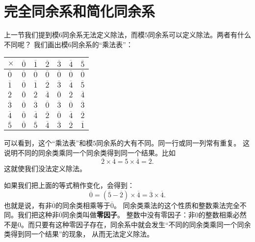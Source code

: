 \documentclass[12pt,UTF8]{ctexbook}
\theoremstyle{definition}
\theoremstyle{plain}
\begin{document}
\section{完全同余系和简化同余系}
上一节我们提到模$6$同余系无法定义除法，而模$5$同余系可以定义除法。两者有什么不同呢？
我们画出模$6$同余系的“乘法表”：
\begin{center}
    \begin{tabular}{ | p{2em}<{\centering} | p{2em}<{\centering} | p{2em}<{\centering} | p{2em}<{\centering} | p{2em}<{\centering} | p{2em}<{\centering} | p{2em}<{\centering} | }
        \hline
            $\times$   & $\overline{0}$ & $\overline{1}$ & $\overline{2}$ & $\overline{3}$ & $\overline{4}$ & $\overline{5}$ \\ [0.5ex] 
        \hline
        $\overline{0}$ & $\overline{0}$ & $\overline{0}$ & $\overline{0}$ & $\overline{0}$ & $\overline{0}$ & $\overline{0}$ \\  
        \hline
        $\overline{1}$ & $\overline{0}$ & $\overline{1}$ & $\overline{2}$ & $\overline{3}$ & $\overline{4}$ & $\overline{5}$ \\
        \hline
        $\overline{2}$ & $\overline{0}$ & $\overline{2}$ & $\overline{4}$ & $\overline{0}$ & $\overline{2}$ & $\overline{4}$ \\
        \hline
        $\overline{3}$ & $\overline{0}$ & $\overline{3}$ & $\overline{0}$ & $\overline{3}$ & $\overline{0}$ & $\overline{3}$ \\
        \hline 
        $\overline{4}$ & $\overline{0}$ & $\overline{4}$ & $\overline{2}$ & $\overline{0}$ & $\overline{4}$ & $\overline{2}$ \\
        \hline
        $\overline{5}$ & $\overline{0}$ & $\overline{5}$ & $\overline{4}$ & $\overline{3}$ & $\overline{2}$ & $\overline{1}$ \\
        \hline
    \end{tabular}
\end{center}
可以看到，这个“乘法表”和模$5$同余系的大有不同。同一行或同一列常有重复。
这说明不同的同余类乘同一个同余类得到同一个结果。比如
$$\overline{2}\times \overline{4} = \overline{5}\times \overline{4} = \overline{2}. $$
这就使我们没法定义除法。

如果我们把上面的等式稍作变化，会得到：
$$\overline{0} = (\overline{5} - \overline{2})\times \overline{4} = \overline{3} \times \overline{4}.$$
也就是说，有非$\overline{0}$的同余类相乘等于$\overline{0}$。
同余类乘法的这个性质和整数乘法完全不同。我们把这种非$\overline{0}$同余类叫做\textbf{零因子}。
整数中没有零因子：非$0$的整数相乘必然不是$0$。而只要有这种零因子存在，同余系中就会发生“不同的同余类乘同一个同余类得到同一个结果”的现象，
从而无法定义除法。
\end{document}
